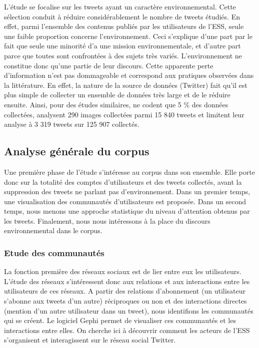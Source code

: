     L’étude se focalise sur les tweets ayant un caractère environnemental. Cette sélection conduit à réduire considérablement le nombre de tweets étudiés. En effet, parmi l’ensemble des contenus publiés par les utilisateurs de l’ESS, seule une faible proportion concerne l’environnement. Ceci s’explique d’une part par le fait que seule une minorité d’\eess a une mission environnementale, et d’autre part parce que toutes sont confrontées à des sujets très variés. L’environnement ne constitue donc qu’une partie de leur discours. Cette apparente perte d’information n’est pas dommageable et correspond aux pratiques observées dans la littérature. En effet, la nature de la source de données (Twitter) fait qu’il est plus simple de collecter un ensemble de données très large et de le réduire ensuite. Ainsi, pour des études similaires, \textcite{kwon2015spatiotemporal} ne codent que 5 \% des données collectées, \textcite{stefanone2015image} analysent 290 images collectées parmi 15 840 tweets et \textcite{xu2014twitter} limitent leur analyse à 3 319 tweets sur 125 907 collectés.

\subsection{Analyse générale du corpus}
    \label{twitter:analysegenerale}
    Une première phase de l'étude s'intéresse au corpus dans son ensemble. Elle porte donc sur la totalité des comptes d'utilisateurs et des tweets collectés, avant la suppression des tweets ne parlant pas d'environnement. Dans un premier temps, une visualisation des communautés d'utilisateurs est proposée. Dans un second temps, nous menons une approche statistique du niveau d'attention obtenus par les tweets. Finalement, nous nous intéressons à la place du discours environnemental dans le corpus.

    \subsubsection{Etude des communautés}
        \label{twitter:commu}
        La fonction première des réseaux sociaux est de lier entre eux les utilisateurs. L’étude des réseaux s’intéressent donc aux relations et aux interactions entre les utilisateurs de ces réseaux. A partir des relations d’abonnement (un utilisateur s’abonne aux tweets d’un autre) réciproques ou non et des interactions directes (mention d’un autre utilisateur dans un tweet), nous identifions les communautés qui se créent. Le logiciel Gephi permet de visualiser ces communautés et les interactions entre elles. On cherche ici à découvrir comment les acteurs de l’ESS s’organisent et interagissent sur le réseau social Twitter.

